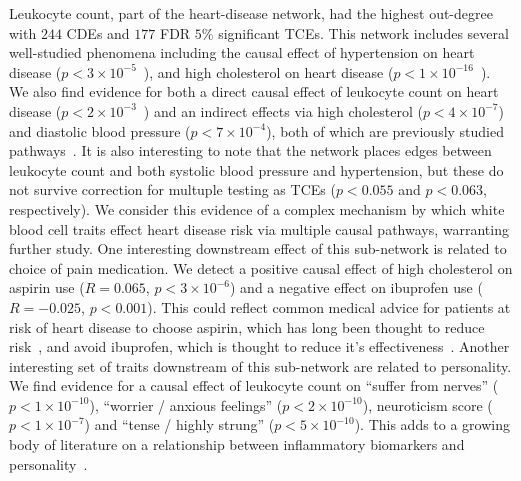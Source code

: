 \documentclass{article}
\begin{document}
Leukocyte count, part of the heart-disease network, had the highest out-degree with $244$ CDEs
and $177$ FDR $5\%$ significant TCEs. This network includes several well-studied phenomena
including the causal effect of hypertension on heart disease ($p < 3 \times 10^{-5}$~\cite{MacMahon1990}),
and high cholesterol on heart disease ($p < 1 \times 10^{-16}$~\cite{Castelli1992}). We also find
evidence for both a direct causal effect of leukocyte count on heart disease
($p < 2 \times 10^{-3}$~\cite{Lee2001})
and an indirect effects via high cholesterol ($p < 4 \times 10^{-7}$) and diastolic blood pressure
($p < 7 \times 10^{-4}$), both of which are previously studied pathways~\cite{Facchini1992}.
It is also interesting to note that the network places edges between
leukocyte count and both systolic blood pressure and hypertension, but these do not survive correction
for multuple testing as TCEs ($p < 0.055$ and $p < 0.063$, respectively). We consider this evidence of
a complex mechanism by which white blood cell traits effect heart disease risk via multiple causal pathways,
warranting further study. One interesting downstream effect of this sub-network is related
to choice of pain medication. We detect a positive causal effect of high cholesterol on aspirin use
($R = 0.065$, $p < 3 \times 10^{-6}$) and a negative effect on ibuprofen use ($R = -0.025$, $p < 0.001$).
This could reflect common medical advice for patients at risk of heart disease to choose aspirin,
which has long been thought to reduce risk~\cite{Sanmuganathan2001}, and avoid ibuprofen, which
is thought to reduce it's effectiveness~\cite{MacDonald2006}. Another interesting set of traits
downstream of this sub-network are related to personality. We find evidence for a causal effect of
leukocyte count on ``suffer from nerves'' ($p < 1 \times 10^{-10}$), ``worrier / anxious feelings'' 
($p < 2 \times 10^{-10}$), neuroticism score ($p < 1 \times 10^{-7}$) and ``tense / highly strung''
($p < 5 \times 10^{-10}$). This adds to a growing body of literature on a relationship between
inflammatory biomarkers and personality~\cite{Allen2017,Sutin2012}.
\end{document}
